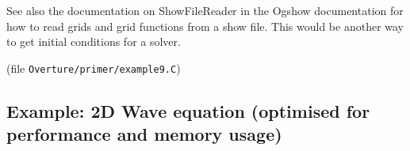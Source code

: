 \documentclass{article}
\begin{document}
See also the documentation on ShowFileReader in the Ogshow documentation
for how to read grids and grid functions from a show file. This would
be another way to get initial conditions for a solver.



(file {\tt Overture/primer/example9.C})
{\footnotesize
{}
}

% 
% 
% 
% 
% 

\vfill\eject
\subsection{Example: 2D Wave equation (optimised for performance and memory usage)}\label{sec:wave}
 
\end{document}
